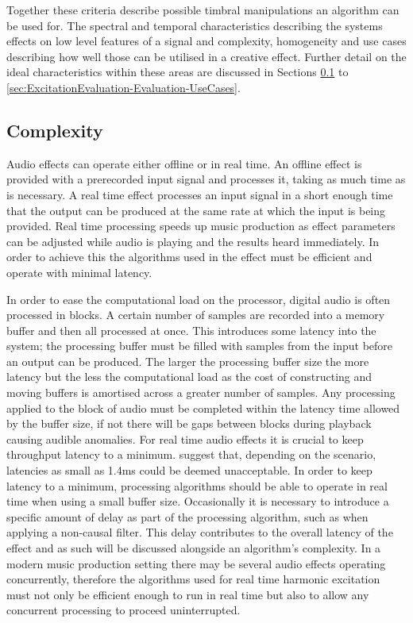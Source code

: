 	Together these criteria describe possible timbral manipulations an algorithm can be used for. The spectral and
	temporal characteristics describing the systems effects on low level features of a signal and complexity,
	homogeneity and use cases describing how well those can be utilised in a creative effect. Further detail on the
	ideal characteristics within these areas are discussed in Sections
	\ref{sec:ExcitationEvaluation-Evaluation-Complexity} to \ref{sec:ExcitationEvaluation-Evaluation-UseCases}.

	\subsection{Complexity}
	\label{sec:ExcitationEvaluation-Evaluation-Complexity}
		Audio effects can operate either offline or in real time. An offline effect is provided with a prerecorded
		input signal and processes it, taking as much time as is necessary. A real time effect processes an input
		signal in a short enough time that the output can be produced at the same rate at which the input is being
		provided. Real time processing speeds up music production as effect parameters can be adjusted while audio
		is playing and the results heard immediately. In order to achieve this the algorithms used in the effect
		must be efficient and operate with minimal latency. 

		In order to ease the computational load on the processor, digital audio is often processed in blocks.  A
		certain number of samples are recorded into a memory buffer and then all processed at once. This introduces
		some latency into the system; the processing buffer must be filled with samples from the input before an
		output can be produced. The larger the processing buffer size the more latency but the less the
		computational load as the cost of constructing and moving buffers is amortised across a greater number of
		samples. Any processing applied to the block of audio must be completed within the latency time allowed by
		the buffer size, if not there will be gaps between blocks during playback causing audible anomalies. For
		real time audio effects it is crucial to keep throughput latency to a minimum. \citet{lester2007the}
		suggest that, depending on the scenario, latencies as small as 1.4ms could be deemed unacceptable. In order
		to keep latency to a minimum, processing algorithms should be able to operate in real time when using a
		small buffer size.  Occasionally it is necessary to introduce a specific amount of delay as part of the
		processing algorithm, such as when applying a non-causal filter. This delay contributes to the overall
		latency of the effect and as such will be discussed alongside an algorithm's complexity.  In a modern music
		production setting there may be several audio effects operating concurrently, therefore the algorithms used
		for real time harmonic excitation must not only be efficient enough to run in real time but also to allow
		any concurrent processing to proceed uninterrupted.


